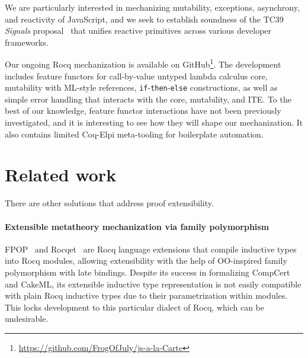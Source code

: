 \documentclass[sigplan,nonacm,review]{acmart}
\begin{document}
We are particularly interested in mechanizing
mutability, exceptions, asynchrony, and reactivity of JavaScript, and we seek to establish soundness of the TC39 \emph{Signals} proposal~\cite{signals-proposal-t39} that unifies reactive primitives across various developer frameworks. 



Our ongoing Rocq mechanization is available on
GitHub\footnote{\url{https://github.com/FrogOfJuly/js-a-la-Carte}}. 
The development includes feature functors for call-by-value untyped lambda calculus core, mutability with ML-style references, \texttt{if}-\texttt{then}-\texttt{else} constructions, as well as simple error handling that interacts with the core, mutability, and ITE. To the best of our knowledge, feature functor interactions have not been previously investigated, and it is interesting to see how they will shape our mechanization. It also contains limited Coq-Elpi meta-tooling for boilerplate automation.

\section{Related work}

There are other solutions that address proof extensibility. 


\paragraph{Extensible metatheory mechanization via family polymorphism} FPOP~\cite{jin2023extensible} and Rocqet~\cite{ebresafe2025certified} are Rocq language extensions that compile inductive types into Rocq modules, allowing extensibility with the help of OO-inspired family polymorphism with late bindings. 
%
%
%
%
Despite its success in formalizing CompCert and CakeML, its extensible inductive type representation is not easily compatible with plain Rocq inductive types due to their parametrization within modules. This locks development to this particular dialect of Rocq, which can be undesirable.

\end{document}
